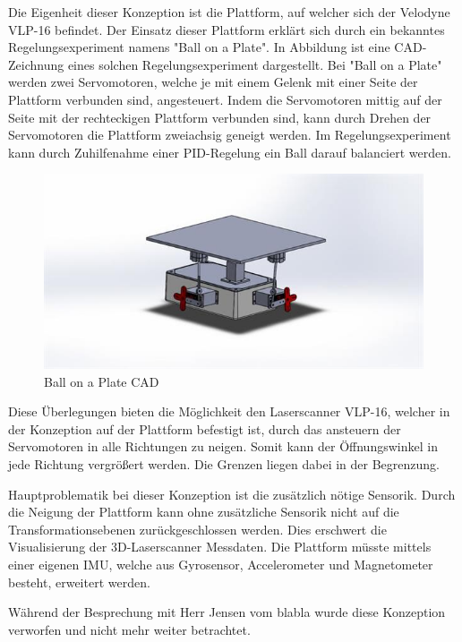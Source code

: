  Die Eigenheit dieser Konzeption ist die Plattform, auf welcher sich der Velodyne VLP-16 befindet. Der Einsatz dieser Plattform erklärt sich durch ein bekanntes Regelungsexperiment namens "Ball on a Plate". In Abbildung ist eine CAD-Zeichnung eines solchen Regelungsexperiment dargestellt. Bei "Ball on a Plate" werden zwei Servomotoren, welche je mit einem Gelenk mit einer Seite der Plattform verbunden sind, angesteuert. Indem die Servomotoren mittig auf der Seite mit der rechteckigen Plattform verbunden sind, kann durch Drehen der Servomotoren die Plattform zweiachsig geneigt werden. Im Regelungsexperiment kann durch Zuhilfenahme einer PID-Regelung ein Ball darauf balanciert werden. 
 
\begin{figure}[H]
	\centering
 	\includegraphics[width=1\textwidth]{resources/ballonaplate_cad}
	\caption{Ball on a Plate CAD {\cite{ballonaplate}}}
	\label{fig:BalllonaPlateCAD}
\end{figure} 

 Diese Überlegungen bieten die Möglichkeit den Laserscanner VLP-16, welcher in der Konzeption auf der Plattform befestigt ist, durch das ansteuern der Servomotoren in alle Richtungen zu neigen. Somit kann  der Öffnungswinkel in jede Richtung vergrößert werden. Die Grenzen liegen dabei in der Begrenzung.
 
 Hauptproblematik bei dieser Konzeption ist die zusätzlich nötige Sensorik. Durch die Neigung der Plattform kann ohne zusätzliche Sensorik nicht auf die Transformationsebenen zurückgeschlossen werden. Dies erschwert die Visualisierung der 3D-Laserscanner Messdaten. Die Plattform müsste mittels einer eigenen IMU, welche aus Gyrosensor, Accelerometer und Magnetometer besteht, erweitert werden.
 
 Während der Besprechung mit Herr Jensen vom blabla  wurde diese Konzeption verworfen und nicht mehr weiter betrachtet.
 
